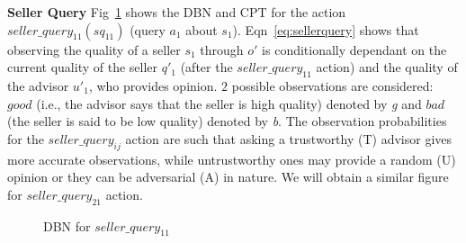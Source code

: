 \documentclass{aamas2014}
\begin{document}
 \textbf{Seller Query} Fig~\ref{fig:AskA1S1} shows the DBN and CPT for the action $seller\_query_{11} (sq_{11})$ (query $a_1$ about $s_1$).  Eqn~\ref{eq:sellerquery} shows that observing the quality of a seller $s_1$ through $o'$ is conditionally dependant on the current quality of the seller $q'_1$ (after the $seller\_query_{11}$ action) and the quality of the advisor $u'_1$, who provides opinion. $2$ possible observations are considered: $good$ (i.e., the advisor says that the seller is high quality) denoted by \textit{g} and $bad$ (the seller is said to be low quality) denoted by \textit{b}.  The observation probabilities for the $seller\_query_{ij}$ action are such that asking a trustworthy (T) advisor gives more accurate observations, while untrustworthy ones may provide a random (U) opinion or they can be adversarial (A) in nature.  We will obtain a similar figure for $seller\_query_{21}$ action.\\
  \begin{figure}[h!]
\vspace{-2mm}
\caption{DBN for $seller\_query_{11}$} \label{fig:AskA1S1}
\end{figure}
\end{document}

